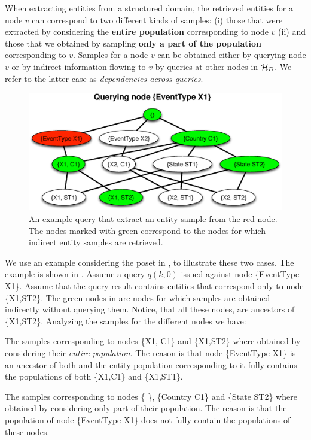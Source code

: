  When extracting entities from a structured domain, the retrieved entities for a node $v$ can correspond to two different kinds of samples: (i) those that were extracted by considering the {\bf entire population} corresponding to node $v$ (ii) and those that we obtained by sampling {\bf only a part of the population} corresponding to $v$. Samples for a node $v$ can be obtained either by querying node $v$ or by indirect information flowing to $v$ by queries at other nodes in $\mathcal{H}_D$. We refer to the latter case as {\em dependencies across queries}. 
\begin{figure}[h]
	\begin{center}
	\vspace{-10pt}
	\includegraphics[clip,scale=0.3]{figs/exampleQuery.eps}
	\caption{An example query that extract an entity sample from the red node. The nodes marked with green correspond to the nodes for which indirect entity samples are retrieved.}
	\label{fig:query}
	\vspace{-10pt}
	\end{center}
	\vspace{-5pt}
\end{figure}

We use an example considering the poset in , to illustrate these two cases. The example is shown in . Assume a query $q(k,0)$ issued against node \{EventType X1\}. Assume that the query result contains entities that correspond only to node \{X1,ST2\}. The green nodes in  are nodes for which samples are obtained indirectly without querying them. Notice, that all these nodes, are ancestors of \{X1,ST2\}. Analyzing the samples for the different nodes we have:
\squishlist
\item The samples corresponding to nodes \{X1, C1\} and \{X1,ST2\} where obtained by considering their {\em entire population}. The reason is that node \{EventType X1\} is an ancestor of both and the entity population corresponding to it fully contains the populations of both \{X1,C1\} and \{X1,ST1\}. 
\item The samples corresponding to nodes \{ \}, \{Country C1\} and \{State ST2\} where obtained by considering only part of their population. The reason is that the population of node \{EventType X1\} does not fully contain the populations of these nodes. 
\squishend


